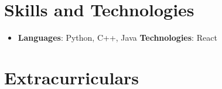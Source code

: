 \documentclass[letterpaper,11pt]{article}
\begin{document}
\section{Skills and Technologies}
    \begin{itemize}[leftmargin=*]
        \item{
             \textbf{Languages}{: Python, C++, Java}
             \hfill
             \textbf{Technologies}{: React}
        }
    \end{itemize}


\section{Extracurriculars}
    \begin{itemize}[leftmargin=*]
        
    \end{itemize}
\end{document}
